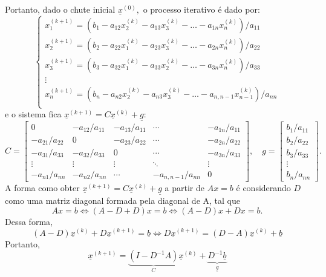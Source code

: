 \documentclass[../numerical_methods.tex]{subfiles}
\begin{document}
Portanto, dado o chute inicial \(\underline{x}^{(0)},\) o processo iterativo é dado por:
\[
	\left\{\begin{array}{ll}
		x_1^{(k+1)} = (b_1-a_{12}x_2^{(k)} - a_{13}x_3^{(k)} -\dotsc - a_{1n}     x_{n}^{(k)})/a_{11}  \\
		x_2^{(k+1)} = (b_2-a_{22}x_1^{(k)}- a_{23}x_3 ^{(k)}-\dotsc - a_{2n}      x_{n}^{(k)})/a_{22}  \\
		x_3^{(k+1)} = (b_3-a_{32}x_1^{(k)}- a_{33}x_2 ^{(k)}-\dotsc - a_{3n}      x_{n}^{(k)})/a_{33}  \\
		\vdots                                                                                         \\
		x_n^{(k+1)} = (b_n-a_{n2}x_2^{(k)} - a_{n3}x_3^{(k)} -\dotsc - a_{n, n-1}x_{n-1}^{(k)})/a_{nn} \\
	\end{array}\right.
\]
e o sistema fica \(\underline{x}^{(k+1)} = C\underline{x}^{(k)} + \underline{g}\):
\[
	C = \begin{bmatrix}
		0              & -a_{12}/a_{11} & -a_{13}/a_{11} & \cdots            & -a_{1n}/a_{11} \\
		-a_{21}/a_{22} & 0              & -a_{23}/a_{22} & \cdots            & -a_{2n}/a_{22} \\
		-a_{31}/a_{33} & -a_{32}/a_{33} & 0              & \cdots            & -a_{3n}/a_{33} \\
		\vdots         & \vdots         & \vdots         & \ddots            & \vdots         \\
		-a_{n1}/a_{nn} & -a_{n2}/a_{nn} & \cdots         & -a_{n,n-1}/a_{nn} & 0
	\end{bmatrix},\quad g=\begin{bmatrix}
		b_1/a_{11} \\
		b_2/a_{22} \\
		b_3/a_{33} \\
		\vdots     \\
		b_n/a_{nn}
	\end{bmatrix}.
\]
A forma como obter \(\underline{x}^{(k+1)} = C\underline{x}^{(k)} + \underline{g}\) a partir de \(Ax = b\) é considerando \(D\) como uma matriz diagonal formada pela diagonal de A, tal que
\[
	Ax = b \Longleftrightarrow (A-D+D)x = b \Longleftrightarrow (A-D)x + Dx = b.
\]
Dessa forma,
\[
	(A-D)\underline{x}^{(k)} + D\underline{x}^{(k+1)}=\underline{b} \Longleftrightarrow D\underline{x}^{(k+1)} = (D-A)\underline{x}^{(k)} + \underline{b}
\]
Portanto,
\[
	\underline{x}^{(k+1)} = \underbrace{(I-D^{-1}A)}_{C}\underline{x}^{(k)} + \underbrace{D^{-1}\underline{b}}_{\underline{g}}
\]
\end{document}
